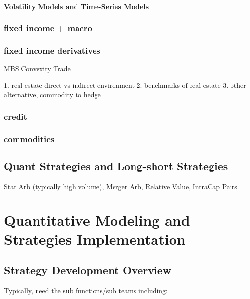 \documentclass[11pt, openany]{book}              %
\begin{document}
	\subsection{Volatility Models and Time-Series Models}
	
\section{fixed income + macro}
\section{fixed income derivatives}

MBS Convexity Trade

    1. real estate-direct vs indirect environment  
    2. benchmarks of real estate
    3. other alternative, commodity to hedge

\section{credit}
\section{commodities} 

\chapter{Quant Strategies and Long-short Strategies}

Stat Arb (typically high volume), Merger Arb, Relative Value, IntraCap Pairs 
 

\part{Quantitative Modeling and Strategies Implementation}

\chapter{Strategy Development Overview}

Typically, need the sub functions/sub teams including:
\end{document}
